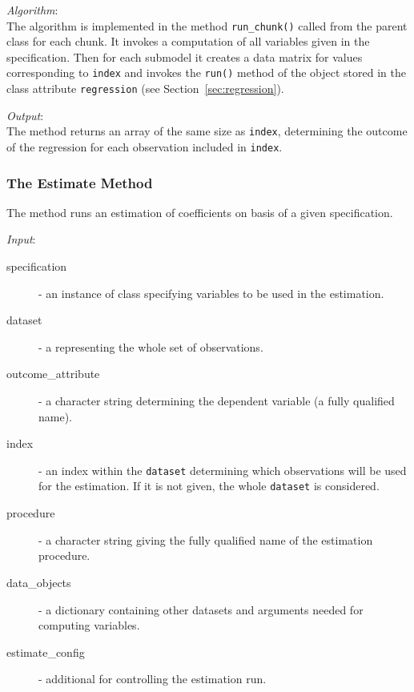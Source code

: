 {{\it Algorithm}:~\\[1mm]
The algorithm is implemented in the method \verb|run_chunk()| called from the
parent class  for each chunk. It invokes a computation of
all variables \variablesindex given in the specification. Then for each submodel it creates a
data matrix for values corresponding to \verb|index| and invokes the
\verb|run()| method of the object stored in the class attribute \attributesindex
\verb|regression| (see Section~\ref{sec:regression}).

{\it Output}:~\\[1mm]
The method returns an array of the same size as \verb|index|, determining the
outcome of the regression for each observation included in \verb|index|.

\subsubsection{The Estimate Method}
The  method runs an estimation of coefficients \coefficientsindex on basis of
a given specification.

{\it Input}:
\begin{description}
\item[specification] - an instance of class 
  specifying variables \variablesindex to be used in the estimation.
\item[dataset] \datasetindex - a  \datasetindex representing the whole set of observations.
\item[outcome_attribute] - a character string determining the dependent
  variable \variablesindex (a fully qualified name).
\item[index] - an index within the \verb|dataset| \datasetindex determining which
  observations will be used for the estimation. If it is not given, the whole
  \verb|dataset| \datasetindex is considered.
\item[procedure] - a character string giving the fully qualified name of the
  estimation procedure.
\item[data_objects] - a dictionary containing other datasets \datasetindex and arguments
  needed for computing variables. \variablesindex
\item[estimate_config] - additional  for controlling the
  estimation run.
\end{description}

}
